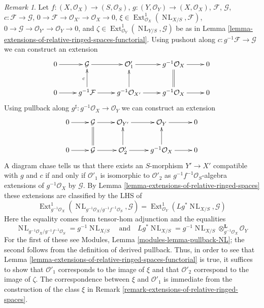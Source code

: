 \documentclass{stacks-project}
\theoremstyle{plain}
\theoremstyle{definition}
\theoremstyle{remark}
\newtheorem{remark}[subsection]{Remark}
\numberwithin{equation}{subsection}
\def\Ext{\mathop{\mathrm{Ext}}\nolimits}
\def\NL{\mathop{N\!L}\nolimits}
\begin{document}
\begin{remark}
\label{remark-extensions-of-relative-ringed-spaces-functorial}
Let $f : (X, \mathcal{O}_X) \to (S, \mathcal{O}_S)$,
$g : (Y, \mathcal{O}_Y) \to (X, \mathcal{O}_X)$,
$\mathcal{F}$,
$\mathcal{G}$,
$c : \mathcal{F} \to \mathcal{G}$,
$0 \to \mathcal{F} \to \mathcal{O}_{X'} \to \mathcal{O}_X \to 0$,
$\xi \in \Ext^1_{\mathcal{O}_X}(\NL_{X/S}, \mathcal{F})$,
$0 \to \mathcal{G} \to \mathcal{O}_{Y'} \to \mathcal{O}_Y \to 0$,
and $\zeta \in \Ext^1_{\mathcal{O}_Y}(\NL_{Y/S}, \mathcal{G})$
be as in Lemma \ref{lemma-extensions-of-relative-ringed-spaces-functorial}.
Using pushout along $c : g^{-1}\mathcal{F} \to \mathcal{G}$
we can construct an extension
$$
\xymatrix{
0 \ar[r] &
\mathcal{G} \ar[r] &
\mathcal{O}'_1 \ar[r] &
g^{-1}\mathcal{O}_X \ar[r] & 0 \\
0 \ar[r] &
g^{-1}\mathcal{F} \ar[u]^c \ar[r] &
g^{-1}\mathcal{O}_{X'} \ar[u] \ar[r] &
g^{-1}\mathcal{O}_X \ar@{=}[u] \ar[r] & 0
}
$$
Using pullback along
$g^\sharp : g^{-1}\mathcal{O}_X \to \mathcal{O}_Y$
we can construct an extension
$$
\xymatrix{
0 \ar[r] &
\mathcal{G} \ar[r] &
\mathcal{O}_{Y'} \ar[r] &
\mathcal{O}_Y \ar[r] & 0 \\
0 \ar[r] &
\mathcal{G} \ar@{=}[u] \ar[r] &
\mathcal{O}'_2 \ar[u] \ar[r] &
g^{-1}\mathcal{O}_X \ar[u] \ar[r] & 0
}
$$
A diagram chase tells us that there exists an $S$-morphism $Y' \to X'$
compatible with $g$ and $c$ if and only if $\mathcal{O}'_1$ is isomorphic
to $\mathcal{O}'_2$ as $g^{-1}f^{-1}\mathcal{O}_S$-algebra extensions
of $g^{-1}\mathcal{O}_X$ by $\mathcal{G}$. By
Lemma \ref{lemma-extensions-of-relative-ringed-spaces}
these extensions are classified by the LHS of
$$
\Ext^1_{g^{-1}\mathcal{O}_X}(
\NL_{g^{-1}\mathcal{O}_X/g^{-1}f^{-1}\mathcal{O}_S}, \mathcal{G}) =
\Ext^1_{\mathcal{O}_Y}(Lg^*\NL_{X/S}, \mathcal{G})
$$
Here the equality comes from tensor-hom adjunction and
the equalities
$$
\NL_{g^{-1}\mathcal{O}_X/g^{-1}f^{-1}\mathcal{O}_S} = g^{-1}\NL_{X/S}
\quad\text{and}\quad
Lg^*\NL_{X/S} =
g^{-1}\NL_{X/S} \otimes_{g^{-1}\mathcal{O}_X}^\mathbf{L} \mathcal{O}_Y
$$
For the first of these see
Modules, Lemma \ref{modules-lemma-pullback-NL}; the second
follows from the definition of derived pullback.
Thus, in order to see that
Lemma \ref{lemma-extensions-of-relative-ringed-spaces-functorial}
is true, it suffices to show that $\mathcal{O}'_1$ corresponds
to the image of $\xi$ and that $\mathcal{O}'_2$ correspond to
the image of $\zeta$.
The correspondence between $\xi$ and $\mathcal{O}'_1$
is immediate from the construction of the class $\xi$ in
Remark \ref{remark-extensions-of-relative-ringed-spaces}.

\end{remark}
\end{document}
